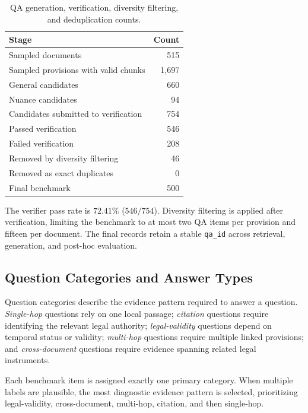 \begin{table}[t]
\centering
\scriptsize
\caption{QA generation, verification, diversity filtering, and deduplication counts.}
\label{tab:qa-generation-counts}
\begin{tabular}{lr}
\toprule
\textbf{Stage} & \textbf{Count} \\
\midrule
Sampled documents & 515 \\
Sampled provisions with valid chunks & 1,697 \\
General candidates & 660 \\
Nuance candidates & 94 \\
Candidates submitted to verification & 754 \\
Passed verification & 546 \\
Failed verification & 208 \\
Removed by diversity filtering & 46 \\
Removed as exact duplicates & 0 \\
Final benchmark & 500 \\
\bottomrule
\end{tabular}
\end{table}

The verifier pass rate is $72.41\%$ ($546/754$). Diversity filtering is applied after verification, limiting the benchmark to at most two QA items per provision and fifteen per document. The final records retain a stable \texttt{qa\_id} across retrieval, generation, and post-hoc evaluation.

\subsection{Question Categories and Answer Types}
\label{sec:question-taxonomy}

Question categories describe the evidence pattern required to answer a question. \textit{Single-hop} questions rely on one local passage; \textit{citation} questions require identifying the relevant legal authority; \textit{legal-validity} questions depend on temporal status or validity; \textit{multi-hop} questions require multiple linked provisions; and \textit{cross-document} questions require evidence spanning related legal instruments.

Each benchmark item is assigned exactly one primary category. When multiple labels are plausible, the most diagnostic evidence pattern is selected, prioritizing legal-validity, cross-document, multi-hop, citation, and then single-hop.

